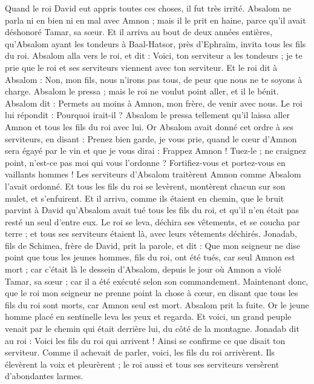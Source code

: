 \begin{multicols}{2}
Quand le roi David eut appris toutes ces choses, il fut très irrité.
Absalom ne parla ni en bien ni en mal avec Amnon ; mais il le prit en haine, parce qu’il avait déshonoré Tamar, sa sœur.
Et il arriva au bout de deux années entières, qu’Absalom ayant les tondeurs à Baal-Hatsor, près d'Ephraïm, invita tous les fils du roi.
Absalom alla vers le roi, et dit : Voici, ton serviteur a les tondeurs ; je te prie que le roi et ses serviteurs viennent avec ton serviteur.
Et le roi dit à Absalom : Non, mon fils, nous n’irons pas tous, de peur que nous ne te soyons à charge. Absalom le pressa ; mais le roi ne voulut point aller, et il le bénit.
Absalom dit : Permets au moins à Amnon, mon frère, de venir avec nous. Le roi lui répondit : Pourquoi irait-il ?
Absalom le pressa tellement qu'il laissa aller Amnon et tous les fils du roi avec lui.
Or Absalom avait donné cet ordre à ses serviteurs, en disant : Prenez bien garde, je vous prie, quand le cœur d'Amnon sera égayé par le vin et que je vous dirai : Frappez Amnon ! Tuez-le ; ne craignez point, n'est-ce pas moi qui vous l’ordonne ? Fortifiez-vous et portez-vous en vaillants hommes !
Les serviteurs d'Absalom traitèrent Amnon comme Absalom l’avait ordonné. Et tous les fils du roi se levèrent, montèrent chacun sur son mulet, et s'enfuirent.
Et il arriva, comme ils étaient en chemin, que le bruit parvint à David qu'Absalom avait tué tous les fils du roi, et qu'il n'en était pas resté un seul d’entre eux.
Le roi se leva, déchira ses vêtements, et se coucha par terre ; et tous ses serviteurs étaient là, avec leurs vêtements déchirés.
Jonadab, fils de Schimea, frère de David, prit la parole, et dit : Que mon seigneur ne dise point que tous les jeunes hommes, fils du roi, ont été tués, car seul Amnon est mort ; car c’était là le dessein d’Absalom, depuis le jour où Amnon a violé Tamar, sa sœur ; car il a été exécuté selon son commandement.
Maintenant donc, que le roi mon seigneur ne prenne point la chose à cœur, en disant que tous les fils du roi sont morts, car Amnon seul est mort.
Absalom prit la fuite. Or le jeune homme placé en sentinelle leva les yeux et regarda. Et voici, un grand peuple venait par le chemin qui était derrière lui, du côté de la montagne.
Jonadab dit au roi : Voici les fils du roi qui arrivent ! Ainsi se confirme ce que disait ton serviteur.
Comme il achevait de parler, voici, les fils du roi arrivèrent. Ils élevèrent la voix et pleurèrent ; le roi aussi et tous ses serviteurs versèrent d’abondantes larmes.

\end{multicols}
